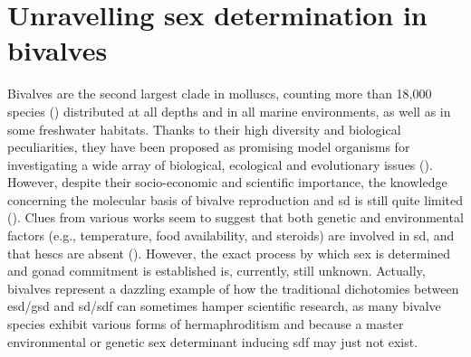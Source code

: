 \section{Unravelling sex determination in bivalves}
Bivalves are the second largest clade in molluscs, counting more than 18,000 species () distributed at all depths and in all marine environments, as well as in some freshwater habitats. Thanks to their high diversity and biological peculiarities, they have been proposed as promising model organisms for investigating a wide array of biological, ecological and evolutionary issues (\textbf{\cite{milani2020faraway,ghiselli2021bivalve}}). However, despite their socio-economic and scientific importance, the knowledge concerning the molecular basis of bivalve reproduction and \gls{sd} is still quite limited (\textbf{\cite{breton2018sex}}). Clues from various works seem to suggest that both genetic and environmental factors (e.g., temperature, food availability, and steroids) are involved in \gls{sd}, and that \glspl{hesc} are absent (\textbf{\cite{breton2018sex,han2022ancient}}). However, the exact process by which sex is determined and gonad commitment is established is, currently, still unknown. Actually, bivalves represent a dazzling example of how the traditional dichotomies between \gls{esd}/\gls{gsd} and \gls{sd}/\gls{sdf} can sometimes hamper scientific research, as many bivalve species exhibit various forms of hermaphroditism and because a master environmental or genetic sex determinant inducing \gls{sdf} may just not exist.


